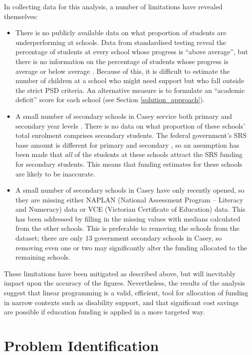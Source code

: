 \documentclass[11pt, a4paper]{article}
\begin{document}
    In collecting data for this analysis, a number of limitations have revealed themselves:

    \begin{itemize}
        \item There is no publicly available data on what proportion of students are underperforming at schools. Data from standardised testing reveal the percentage of students at every school whose progress is ``above average'', but there is no information on the percentage of students whose progress is average or below average \parencite{naplan}. Because of this, it is difficult to estimate the number of children at a school who might need support but who fall outside the strict PSD criteria. An alternative measure is to formulate an ``academic deficit'' score for each school (see Section \ref{solution_approach}).
        \item A small number of secondary schools in Casey service both primary and secondary year levels \parencite{casey_schools}. There is no data on what proportion of these schools' total enrolment comprises secondary students. The federal government's SRS base amount is different for primary and secondary \parencite{srs_2020}, so an assumption has been made that \textit{all} of the students at these schools attract the SRS funding for secondary students. This means that funding estimates for these schools are likely to be inaccurate.
        \item A small number of secondary schools in Casey have only recently opened, so they are missing either NAPLAN (National Assessment Program – Literacy and Numeracy) data or VCE (Victorian Certificate of Education) data. This has been addressed by filling in the missing values with medians calculated from the other schools. This is preferable to removing the schools from the dataset; there are only 13 government secondary schools in Casey, so removing even one or two may significantly alter the funding allocated to the remaining schools.
    \end{itemize}

    These limitations have been mitigated as described above, but will inevitably impact upon the accuracy of the figures. Nevertheless, the results of the analysis suggest that linear programming is a valid, efficient, tool for allocation of funding in narrow contexts such as disability support, and that significant cost savings are possible if education funding is applied in a more targeted way.  

    \section{Problem Identification} \label{problem_id}
\end{document}
